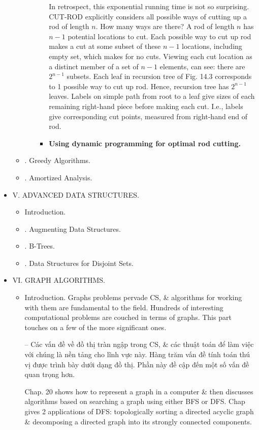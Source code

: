 \documentclass{article}
\begin{document}
\begin{itemize}
\begin{itemize}
\begin{itemize}
\begin{itemize}
				In retrospect, this exponential running time is not so surprising. CUT-ROD explicitly considers all possible ways of cutting up a rod of length $n$. How many ways are there? A rod of length $n$ has $n - 1$ potential locations to cut. Each possible way to cut up rod makes a cut at some subset of these $n - 1$ locations, including empty set, which makes for no cuts. Viewing each cut location as a distinct member of a set of $n - 1$ elements, can see: there are $2^{n-1}$ subsets. Each leaf in recursion tree of {\sf Fig. 14.3} corresponds to 1 possible way to cut up rod. Hence, recursion tree has $2^{n-1}$ leaves. Labels on simple path from root to a leaf give sizes of each remaining right-hand piece before making each cut. I.e., labels give corresponding cut points, measured from right-hand end of rod.
				\item {\bf Using dynamic programming for optimal rod cutting.}
			\end{itemize}
		\end{itemize}
		\item {. Greedy Algorithms.}
		\item {. Amortized Analysis.}
	\end{itemize}
	\item {\sf V. ADVANCED DATA STRUCTURES.}
	\begin{itemize}
		\item {\sf Introduction.}
		\item {. Augmenting Data Structures.}
		\item {. B-Trees.}
		\item {. Data Structures for Disjoint Sets.}
	\end{itemize}
	\item {\sf VI. GRAPH ALGORITHMS.}
	\begin{itemize}
		\item {\sf Introduction.} Graphs problems pervade CS, \& algorithms for working with them are fundamental to the field. Hundreds of interesting computational problems are couched in terms of graphs. This part touches on a few of the more significant ones.
		
		-- Các vấn đề về đồ thị tràn ngập trong CS, \& các thuật toán để làm việc với chúng là nền tảng cho lĩnh vực này. Hàng trăm vấn đề tính toán thú vị được trình bày dưới dạng đồ thị. Phần này đề cập đến một số vấn đề quan trọng hơn.
		
		Chap. 20 shows how to represent a graph in a computer \& then discusses algorithms based on searching a graph using either BFS or DFS. Chap gives 2 applications of DFS: topologically sorting a directed acyclic graph \& decomposing a directed graph into its strongly connected components.
		

\end{itemize}
\end{itemize}
\end{document}
